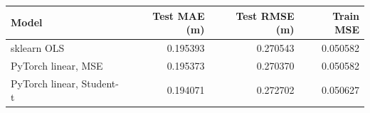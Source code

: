 \begin{tabular}{lrrr}
\toprule
Model & Test MAE (m) & Test RMSE (m) & Train MSE \\
\midrule
sklearn OLS & 0.195393 & 0.270543 & 0.050582 \\
PyTorch linear, MSE & 0.195373 & 0.270370 & 0.050582 \\
PyTorch linear, Student-t & 0.194071 & 0.272702 & 0.050627 \\
\bottomrule
\end{tabular}
